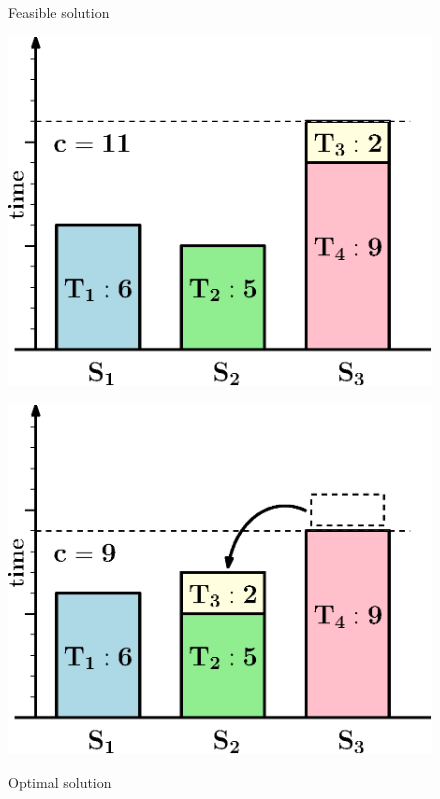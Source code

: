 \begin{figure}[tpb]
	\centering
	\begin{minipage}{0.45\textwidth}
		\centering
		\caption{Feasible solution}
		\vspace{2mm}
		\includegraphics[width=\linewidth]{images/exSimpleFeas.eps}
		\label{fig:intro:exSchedFeas}
	\end{minipage}
	\hfill
	\begin{minipage}{0.45\textwidth}
		\centering
		\vfill
		\caption{Optimal solution}
		\vspace{2mm}
		\includegraphics[width=\linewidth]{images/exSimpleOpt.eps}
		\label{fig:intro:exSchedOpt}
	\end{minipage}
\end{figure}

